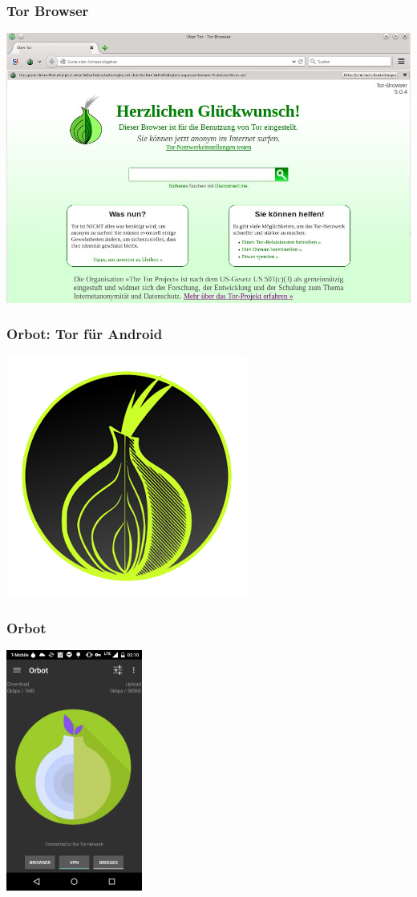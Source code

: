   \begin{frame}
    \frametitle{Tor Browser}
    \includegraphics[width=1\textwidth, height=0.7\textheight]{../../img/tor_browser.jpg}          
  \end{frame}
  
  \begin{frame}
    \frametitle{Orbot: Tor für Android}
    \includegraphics[height=0.7\textheight]{../../img/orbot.png}              
  \end{frame}
  
  \begin{frame}
    \frametitle{Orbot}
    \includegraphics[height=0.7\textheight]{../../img/orbot1.png}                  
  \end{frame}
